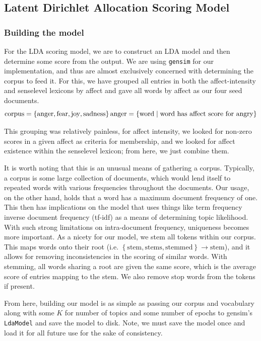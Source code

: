 \documentclass[11pt, twoside, reqno]{book}
\begin{document}
\subsection{Latent Dirichlet Allocation Scoring Model}
\vspace{12pt}
\subsubsection{\textbf{Building the model}}

For the LDA scoring model, we are to construct an LDA model and then determine some score from the output. We are using \texttt{gensim} for our implementation, and thus are almost exclusively concerned with determining the corpus to feed it. For this, we have grouped all entries in both the affect-intensity and senselevel lexicons by affect and gave all words by affect as our four seed documents.
$$\text{corpus} = \left\{\text{anger}, \text{fear}, \text{joy}, \text{sadness}\right\}\\\text{anger} = \left\{\text{word}\mid \text{word has affect score for angry}\right\}$$

\noindent This grouping was relatively painless, for affect intensity, we looked for non-zero scores in a given affect as criteria for membership, and we looked for affect existence within the senselevel lexicon; from here, we just combine them.

It is worth noting that this is an unusual means of gathering a corpus. Typically, a corpus is some large collection of documents, which would lend itself to repeated words with various frequencies throughout the documents. Our usage, on the other hand, holds that a word has a maximum document frequency of one. This then has implications on the model that uses things like term frequency inverse document frequency (tf-idf) \cite{david_m._y._i._1970} as a means of determining topic likelihood. With such strong limitations on intra-document frequency, uniqueness becomes more important. As a nicety for our model, we stem all tokens within our corpus. This maps words onto their root (i.e. $\left\{ \text{stem}, \text{stems}, \text{stemmed} \right\} \rightarrow \text{stem} $), and it allows for removing inconsistencies in the scoring of similar words. With stemming, all words sharing a root are given the same score, which is the average score of entries mapping to the stem. We also remove stop words from the tokens if present.

From here, building our model is as simple as passing our corpus and vocabulary along with some $K$ for number of topics and some number of epochs to gensim's \texttt{LdaModel} and save the model to disk. Note, we must save the model once and load it for all future use for the sake of consistency.
\end{document}
